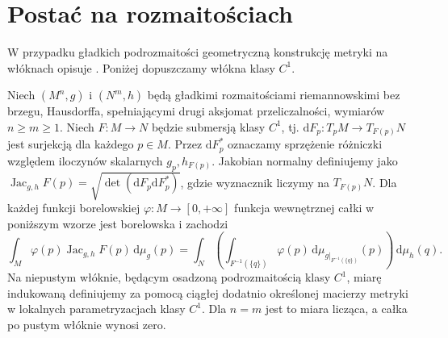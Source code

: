 \section{Postać na rozmaitościach}
W przypadku gładkich podrozmaitości geometryczną konstrukcję
metryki na włóknach opisuje .
Poniżej dopuszczamy włókna klasy $C^1$.

\begin{twierdzenie}
\label{thm:coarea-manifolds-28}
Niech $(M^n,g)$ i $(N^m,h)$ będą gładkimi rozmaitościami
riemannowskimi bez brzegu, Hausdorffa, spełniającymi drugi
aksjomat przeliczalności, wymiarów $n\ge m\ge1$.
Niech $F:M\to N$ będzie submersją klasy $C^1$, tj.
$\mathrm dF_p:T_pM\to T_{F(p)}N$ jest surjekcją dla każdego
$p\in M$. Przez $\mathrm dF_p^*$ oznaczamy sprzężenie
różniczki względem iloczynów skalarnych $g_p,h_{F(p)}$.
Jakobian normalny definiujemy jako
$\operatorname{Jac}_{g,h}F(p)=
\sqrt{\det(\mathrm dF_p\mathrm dF_p^*)}$,
gdzie wyznacznik liczymy na $T_{F(p)}N$.
Dla każdej funkcji borelowskiej $\varphi:M\to[0,+\infty]$
funkcja wewnętrznej całki w poniższym wzorze jest
borelowska i zachodzi
\begin{equation}\label{eq:coarea-manifolds-28}
 \int_M\varphi(p)\operatorname{Jac}_{g,h}F(p)
 \,\mathrm d\mu_g(p)
 =\int_N\left(\int_{F^{-1}(\{q\})}\varphi(p)
 \,\mathrm d\mu_{g|_{F^{-1}(\{q\})}}(p)\right)
 \,\mathrm d\mu_h(q).
\end{equation}
Na niepustym włóknie, będącym osadzoną podrozmaitością
klasy $C^1$, miarę indukowaną definiujemy za pomocą
ciągłej dodatnio określonej macierzy metryki w lokalnych
parametryzacjach klasy $C^1$. Dla $n=m$ jest to miara
licząca, a całka po pustym włóknie wynosi zero.
\end{twierdzenie}
